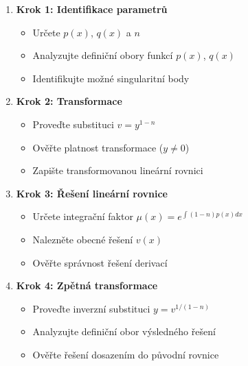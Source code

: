 \begin{method}
\label{met:systematicka-metodologie}
\begin{enumerate}
\item \textbf{Krok 1: Identifikace parametrů}
\begin{itemize}
\item Určete $p(x)$, $q(x)$ a $n$
\item Analyzujte definiční obory funkcí $p(x)$, $q(x)$
\item Identifikujte možné singularitní body
\end{itemize}

\item \textbf{Krok 2: Transformace}
\begin{itemize}
\item Proveďte substituci $v = y^{1-n}$
\item Ověřte platnost transformace ($y \neq 0$)
\item Zapište transformovanou lineární rovnici
\end{itemize}

\item \textbf{Krok 3: Řešení lineární rovnice}
\begin{itemize}
\item Určete integrační faktor $\mu(x) = e^{\int (1-n)p(x)dx}$
\item Nalezněte obecné řešení $v(x)$
\item Ověřte správnost řešení derivací
\end{itemize}

\item \textbf{Krok 4: Zpětná transformace}
\begin{itemize}
\item Proveďte inverzní substituci $y = v^{1/(1-n)}$
\item Analyzujte definiční obor výsledného řešení
\item Ověřte řešení dosazením do původní rovnice
\end{itemize}
\end{enumerate}
\end{method}

\vspace{0.8\baselineskip}

